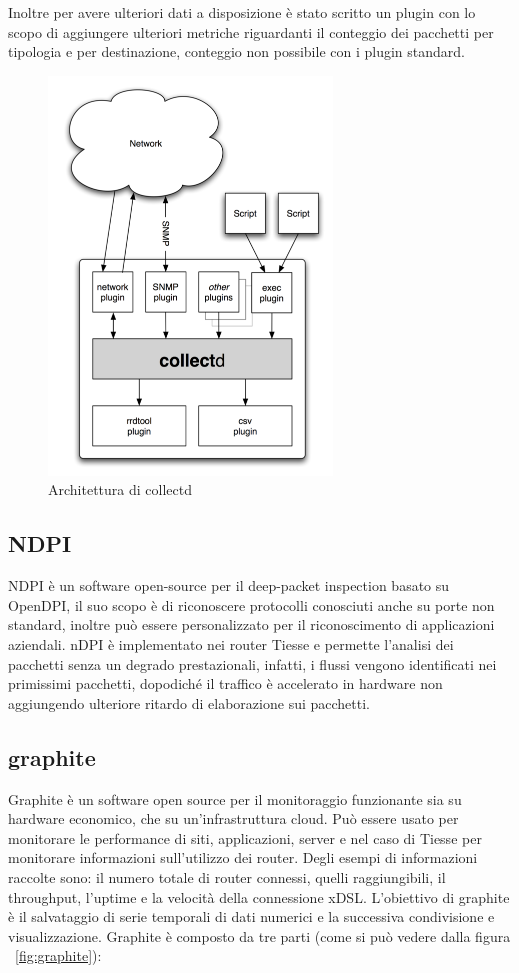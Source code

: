 Inoltre per avere ulteriori dati a disposizione è stato scritto un plugin con lo scopo di aggiungere ulteriori metriche riguardanti il conteggio dei pacchetti per tipologia e per destinazione, conteggio non possibile con i plugin standard.


\begin{figure}[]
    \begin{center}
        \includegraphics[height=300pt]{images/my_work/collectd.png}
    \end{center}
    \caption{Architettura di collectd}
    \label{fig:collectd}
    \centering
\end{figure}

\subsection{NDPI} 
NDPI è un software open-source per il deep-packet inspection basato su OpenDPI, il suo scopo è di riconoscere protocolli conosciuti anche su porte non standard, inoltre può essere personalizzato per il riconoscimento di applicazioni aziendali. nDPI è implementato nei router Tiesse e permette l'analisi dei pacchetti senza un degrado prestazionali, infatti, i flussi vengono identificati nei primissimi pacchetti, dopodiché il traffico è accelerato in hardware non aggiungendo ulteriore ritardo di elaborazione sui pacchetti.


\subsection{graphite} Graphite è un software open source per il monitoraggio funzionante sia su hardware economico, che su un'infrastruttura cloud. Può essere usato per monitorare le performance di siti, applicazioni, server e nel caso di Tiesse per monitorare informazioni sull'utilizzo dei router. Degli esempi di informazioni raccolte sono: il numero totale di router connessi, quelli raggiungibili, il throughput, l'uptime e la velocità della connessione xDSL.
L'obiettivo di graphite è il salvataggio di serie temporali di dati numerici e la successiva condivisione e visualizzazione.
Graphite è composto da tre parti (come si può vedere dalla figura ~\ref{fig:graphite}):

